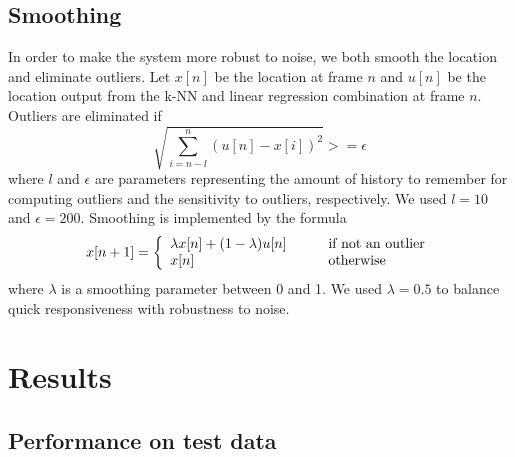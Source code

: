 \documentclass[10pt,twocolumn,letterpaper]{article}
\begin{document}
\subsection{Smoothing}
In order to make the system more robust to noise, we both smooth the location and eliminate outliers. Let $x[n]$ be the location at frame $n$ and $u[n]$ be the location output from the k-NN and linear regression combination at frame $n$. Outliers are eliminated if
\begin{equation}
	\sqrt{\sum_{i=n-l}^{n}(u[n]-x[i])^2} >= \epsilon
\end{equation}
where $l$ and $\epsilon$ are parameters representing the amount of history to remember for computing outliers and the sensitivity to outliers, respectively. We used $l=10$ and $\epsilon=200$. Smoothing is implemented by the formula 
\begin{equation}
	x[n+1] = \left\{
		\begin{array}{l l}
			\lambda x[n] + (1-\lambda)u[n] & \qquad \text{if not an outlier} \\
			x[n] & \qquad \text{otherwise}
		\end{array}
	\right.
\end{equation}
 where $\lambda$ is a smoothing parameter between 0 and 1. We used $\lambda=0.5$ to balance quick responsiveness with robustness to noise.

\section{Results}

\subsection{Performance on test data}
\end{document}

